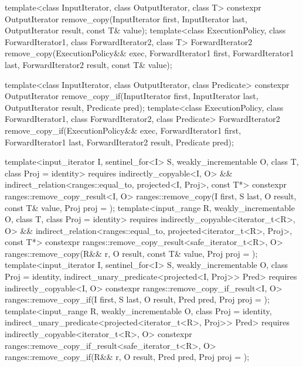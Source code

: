 %
%
\begin{itemdecl}
template<class InputIterator, class OutputIterator, class T>
  constexpr OutputIterator
    remove_copy(InputIterator first, InputIterator last,
                OutputIterator result, const T& value);
template<class ExecutionPolicy, class ForwardIterator1, class ForwardIterator2,
         class T>
  ForwardIterator2
    remove_copy(ExecutionPolicy&& exec,
                ForwardIterator1 first, ForwardIterator1 last,
                ForwardIterator2 result, const T& value);

template<class InputIterator, class OutputIterator, class Predicate>
  constexpr OutputIterator
    remove_copy_if(InputIterator first, InputIterator last,
                   OutputIterator result, Predicate pred);
template<class ExecutionPolicy, class ForwardIterator1, class ForwardIterator2,
         class Predicate>
  ForwardIterator2
    remove_copy_if(ExecutionPolicy&& exec,
                   ForwardIterator1 first, ForwardIterator1 last,
                   ForwardIterator2 result, Predicate pred);

template<input_iterator I, sentinel_for<I> S, weakly_incrementable O, class T,
         class Proj = identity>
  requires indirectly_copyable<I, O> &&
           indirect_relation<ranges::equal_to, projected<I, Proj>, const T*>
  constexpr ranges::remove_copy_result<I, O>
    ranges::remove_copy(I first, S last, O result, const T& value, Proj proj = {});
template<input_range R, weakly_incrementable O, class T, class Proj = identity>
  requires indirectly_copyable<iterator_t<R>, O> &&
           indirect_relation<ranges::equal_to, projected<iterator_t<R>, Proj>, const T*>
  constexpr ranges::remove_copy_result<safe_iterator_t<R>, O>
    ranges::remove_copy(R&& r, O result, const T& value, Proj proj = {});
template<input_iterator I, sentinel_for<I> S, weakly_incrementable O,
         class Proj = identity, indirect_unary_predicate<projected<I, Proj>> Pred>
  requires indirectly_copyable<I, O>
  constexpr ranges::remove_copy_if_result<I, O>
    ranges::remove_copy_if(I first, S last, O result, Pred pred, Proj proj = {});
template<input_range R, weakly_incrementable O, class Proj = identity,
         indirect_unary_predicate<projected<iterator_t<R>, Proj>> Pred>
  requires indirectly_copyable<iterator_t<R>, O>
  constexpr ranges::remove_copy_if_result<safe_iterator_t<R>, O>
    ranges::remove_copy_if(R&& r, O result, Pred pred, Proj proj = {});
\end{itemdecl}

